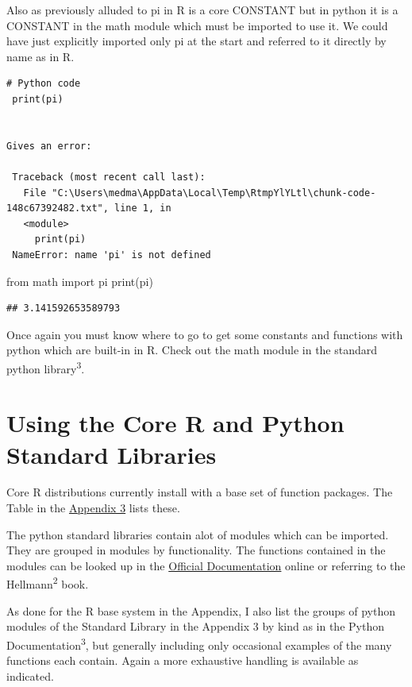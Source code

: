 \documentclass[]{book}
\newenvironment{Shaded}{\begin{snugshade}}{\end{snugshade}}
\newcommand{\ImportTok}[1]{#1}
\newcommand{\BuiltInTok}[1]{#1}
\newcommand{\NormalTok}[1]{#1}
\theoremstyle{definition}
\theoremstyle{definition}
\theoremstyle{definition}
\theoremstyle{remark}
\begin{document}
Also as previously alluded to pi in R is a core CONSTANT but in python
it is a CONSTANT in the math module which must be imported to use it. We
could have just explicitly imported only pi at the start and referred to
it directly by name as in R.

\begin{verbatim}
# Python code
 print(pi)


Gives an error:

 Traceback (most recent call last):
   File "C:\Users\medma\AppData\Local\Temp\RtmpYlYLtl\chunk-code-148c67392482.txt", line 1, in
   <module>
     print(pi)
 NameError: name 'pi' is not defined
\end{verbatim}

\begin{Shaded}
\begin{Highlighting}[]
\ImportTok{from}\NormalTok{ math }\ImportTok{import}\NormalTok{ pi}
\BuiltInTok{print}\NormalTok{(pi)}
\end{Highlighting}
\end{Shaded}

\begin{verbatim}
## 3.141592653589793
\end{verbatim}

Once again you must know where to go to get some constants and functions
with python which are built-in in R. Check out the math module
 in the standard python library\textsuperscript{3}.

\section{Using the Core R and Python Standard
Libraries}\label{using-the-core-r-and-python-standard-libraries}

 Core R distributions currently install with a base set of
function packages. The Table in the
\href{17-Appendix_3_Packages.Rmd}{Appendix 3} lists these.

The python standard libraries contain alot of modules which can be
imported. They are grouped in modules by functionality. The functions
contained in the modules can be looked up in the
\href{https://docs.python.org/3.7/}{Official Documentation} online or
referring to the Hellmann\textsuperscript{2} book.

As done for the R base system in the Appendix, I also list the groups of
python modules of the Standard Library in the Appendix 3 by kind as in
the Python Documentation\textsuperscript{3}, but generally including
only occasional examples of the many functions each contain. Again a
more exhaustive handling is available as indicated.
\end{document}

